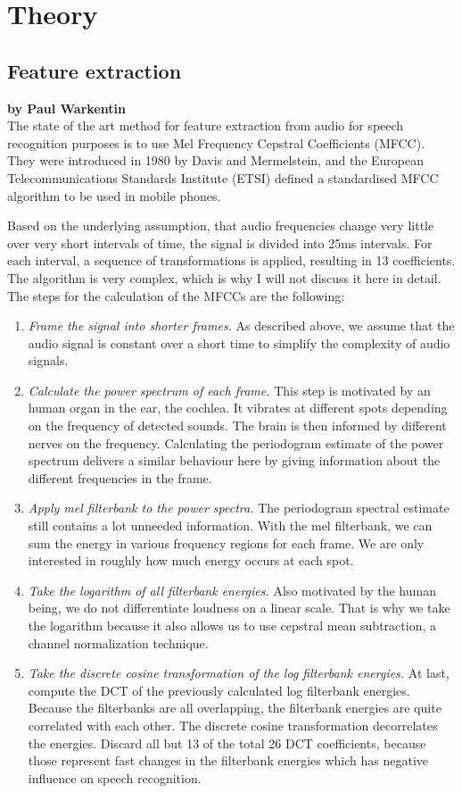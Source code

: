 \chapter{Theory}

\section{Feature extraction}

\textbf{by Paul Warkentin} \\

The state of the art method for feature extraction from audio for speech recognition purposes is to use Mel Frequency Cepstral Coefficients (MFCC). They were introduced in 1980 by Davis and Mermelstein, and the European Telecommunications Standards Institute (ETSI) defined a standardised MFCC algorithm to be used in mobile phones.

Based on the underlying assumption, that audio frequencies change very little over very short intervals of time, the signal is divided into 25ms intervals. For each interval, a sequence of transformations is applied, resulting in 13 coefficients. The algorithm is very complex, which is why I will not discuss it here in detail. The steps for the calculation of the MFCCs are the following:
\begin{enumerate}
  \item \textit{Frame the signal into shorter frames.} As described above, we assume that the audio signal is constant over a short time to simplify the complexity of audio signals.
  \item \textit{Calculate the power spectrum of each frame.} This step is motivated by an human organ in the ear, the cochlea. It vibrates at different spots depending on the frequency of detected sounds. The brain is then informed by different nerves on the frequency. Calculating the periodogram estimate of the power spectrum delivers a similar behaviour here by giving information about the different frequencies in the frame.
  \item \textit{Apply mel filterbank to the power spectra.} The periodogram spectral estimate still contains a lot unneeded information. With the mel filterbank, we can sum the energy in various frequency regions for each frame. We are only interested in roughly how much energy occurs at each spot.
  \item \textit{Take the logarithm of all filterbank energies.} Also motivated by the human being, we do not differentiate loudness on a linear scale. That is why we take the logarithm because it also allows us to use cepstral mean subtraction, a channel normalization technique.
  \item \textit{Take the discrete cosine transformation of the log filterbank energies.} At last, compute the DCT of the previously calculated log filterbank energies. Because the filterbanks are all overlapping, the filterbank energies are quite correlated with each other. The discrete cosine transformation decorrelates the energies. Discard all but 13 of the total 26 DCT coefficients, because those represent fast changes in the filterbank energies which has negative influence on speech recognition.
\end{enumerate}

